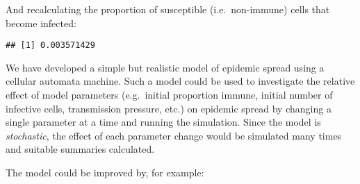 \documentclass[
  12pt,
  a4paper]{book}
\newenvironment{Shaded}{\begin{snugshade}}{\end{snugshade}}
\newcommand{\FunctionTok}[1]{\textcolor[rgb]{0.00,0.00,0.00}{#1}}
\newcommand{\NormalTok}[1]{#1}
\newcommand{\SpecialCharTok}[1]{\textcolor[rgb]{0.00,0.00,0.00}{#1}}
\begin{document}
And recalculating the proportion of susceptible (i.e.~non-immune) cells that become infected:

\begin{Shaded}
\end{Shaded}

\begin{verbatim}
## [1] 0.003571429
\end{verbatim}

We have developed a simple but realistic model of epidemic spread using a cellular automata machine. Such a model could be used to investigate the relative effect of model parameters (e.g.~initial proportion immune, initial number of infective cells, transmission pressure, etc.) on epidemic spread by changing a single parameter at a time and running the simulation. Since the model is \emph{stochastic}, the effect of each parameter change would be simulated many times and suitable summaries calculated.

The model could be improved by, for example:
\end{document}
